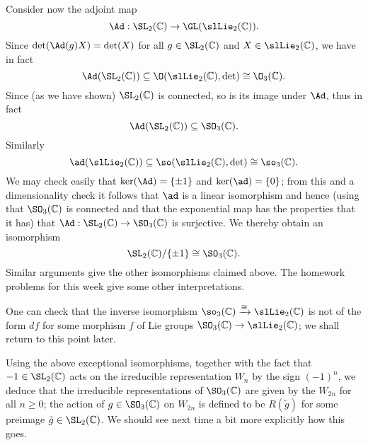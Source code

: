 \documentclass[reqno]{amsart} 
\begin{document}
Consider now the adjoint map
\begin{equation*}
  \Ad : \SL_2(\mathbb{C}) \rightarrow \GL(\slLie_2(\mathbb{C})).
\end{equation*}
Since $\det(\Ad(g) X) = \det(X)$
for all $g \in \SL_2(\mathbb{C})$ and $X \in
\slLie_2(\mathbb{C})$,
we have in fact
\begin{equation*}
  \Ad (\SL_2(\mathbb{C})) \subseteq
  \O(\slLie_2(\mathbb{C}),\det) \cong \O_3(\mathbb{C}).
  \end{equation*}
Since (as we have shown)
$\SL_2(\mathbb{C})$ is connected,
so is its image under $\Ad$,
thus
in fact
\begin{equation*}
  \Ad (\SL_2(\mathbb{C})) \subseteq \SO_3(\mathbb{C}).
\end{equation*}
Similarly
\begin{equation*}
  \ad(\slLie_2(\mathbb{C}))
  \subseteq \so(\slLie_2(\mathbb{C}),\det) \cong \so_3(\mathbb{C}).
\end{equation*}
We may check easily that $\ker(\Ad) = \{\pm 1\}$
and $\ker(\ad) = \{0\}$;
from this and a dimensionality check it follows that $\ad$ is a
linear isomorphism
and hence (using that 
$\SO_3(\mathbb{C})$
is connected and that the exponential map has the properties
that it has)
that
$\Ad : \SL_2(\mathbb{C}) \rightarrow \SO_3(\mathbb{C})$ is
surjective.
We thereby obtain an isomorphism
\begin{equation*}
  \SL_2(\mathbb{C}) / \{\pm 1\} \cong \SO_3(\mathbb{C}).
\end{equation*}
Similar arguments give the other isomorphisms claimed above.
The homework problems for this week give some other
interpretations.

\begin{remark}
  One can check that the inverse isomorphism
  $\so_3(\mathbb{C}) \xrightarrow{\cong } \slLie_2(\mathbb{C})$
  is not of the form $d f$
  for some  morphism $f$ of Lie groups
  $\SO_3(\mathbb{C}) \rightarrow \slLie_2(\mathbb{C})$;
  we shall return to this point later.
\end{remark}

Using the above exceptional isomorphisms, together with the fact
that $-1 \in \SL_2(\mathbb{C})$ acts on the irreducible
representation $W_n$ by the sign $(-1)^n$, we deduce that the
irreducible representations of $\SO_3(\mathbb{C})$ are given by
the $W_{2 n}$ for all $n \geq 0$; the action of
$g \in \SO_3(\mathbb{C})$ on $W_{2 n}$ is defined to be
$R(\tilde{g})$ for some preimage
$\tilde{g} \in \SL_2(\mathbb{C})$.
We should see next time a bit more explicitly how this goes.
\end{document}
